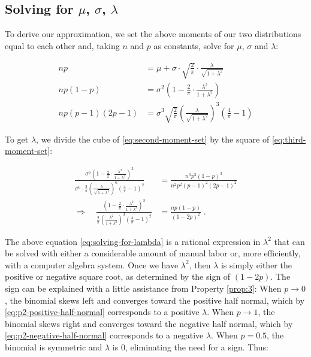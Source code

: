 \documentclass{article}
\begin{document}
\subsection[Solving for mu, sigma, lambda]{Solving for $\mu$, $\sigma$, $\lambda$}
\label{subsec:solving-for-mu-sigma-lambda}

To derive our approximation, we set the above moments of our two distributions
equal to each other and, taking $n$ and $p$ as constants, solve for $\mu$,
$\sigma$ and $\lambda$:

\begin{subequations}
\begin{align}
  np &= \mu + \sigma \cdot \sqrt{\frac{2}{\pi}} \cdot \frac{\lambda}{\sqrt{1 + \lambda^2}} \label{eq:first-moment-set} \\
  np(1-p) &= \sigma^2 \left( 1 - \frac{2}{\pi} \cdot \frac{\lambda^2}{1 + \lambda^2} \right) \label{eq:second-moment-set} \\
  np(p-1)(2p-1) &= \sigma^3 \sqrt{\frac{2}{\pi}} \left( \frac{\lambda}{\sqrt{1 + \lambda^2}} \right)^3 \left( \frac{4}{\pi} - 1 \right) \label{eq:third-moment-set}
\end{align}
\end{subequations}

To get $\lambda$, we divide the cube of \eqref{eq:second-moment-set} by the
square of \eqref{eq:third-moment-set}:

\begin{align}
  \frac{\sigma^6 \left( 1 - \frac{2}{\pi} \cdot \frac{\lambda^2}{1 + \lambda^2} \right)^3}{\sigma^6 \cdot \frac{2}{\pi} \left( \frac{\lambda}{\sqrt{1 + \lambda^2}} \right)^6 \left(
    \frac{4}{\pi} - 1 \right)^2} &= \frac{n^3p^3(1-p)^3}{n^2p^2(p-1)^2(2p-1)^2} \nonumber \\
  \Rightarrow \quad \frac{\left( 1 - \frac{2}{\pi} \cdot \frac{\lambda^2}{1+\lambda^2} \right)^3}{\frac{2}{\pi} \left( \frac{\lambda^2}{1+\lambda^2} \right)^3 \left( \frac{4}{\pi} - 1
    \right)^2} &= \frac{np(1-p)}{(1-2p)^2} \;. \label{eq:solving-for-lambda}
\end{align}

The above equation \eqref{eq:solving-for-lambda} is a rational expression in
$\lambda^2$ that can be solved with either a considerable amount of manual
labor or, more efficiently, with a computer algebra system. Once we have
$\lambda^2$, then $\lambda$ is simply either the positive or negative square
root, as determined by the sign of $(1-2p)$. The sign can be explained with a
little assistance from Property \ref{prop:3}: When $p \to 0$, the binomial
skews left and converges toward the positive half normal, which by
\eqref{eq:p2-positive-half-normal} corresponds to a positive $\lambda$. When $p
\to 1$, the binomial skews right and converges toward the negative half normal,
which by \eqref{eq:p2-negative-half-normal} corresponds to a negative
$\lambda$. When $p = 0.5$, the binomial is symmetric and $\lambda$ is 0,
eliminating the need for a sign. Thus:
\end{document}
